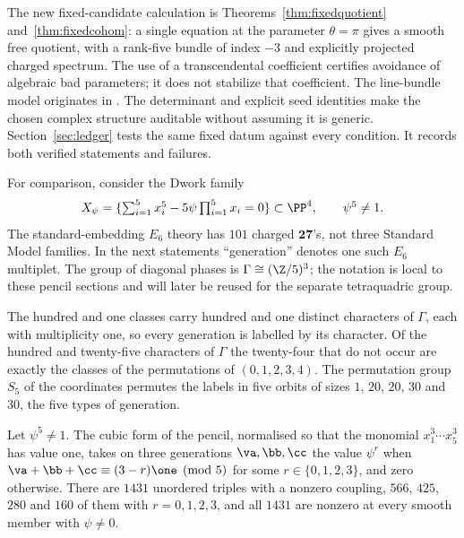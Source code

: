 The new fixed-candidate calculation is
Theorems~\ref{thm:fixedquotient} and~\ref{thm:fixedcohom}:
a single equation at the parameter $\theta=\pi$ gives a smooth free
quotient, with a rank-five bundle of index $-3$ and explicitly projected
charged spectrum. The use of a transcendental coefficient certifies
avoidance of algebraic bad parameters; it does not stabilize that
coefficient. The line-bundle model originates in \cite{BCL}.
The determinant and explicit seed identities make the chosen
complex structure auditable without assuming it is generic.
Section~\ref{sec:ledger} tests the same fixed datum against every
condition. It records both verified statements and failures.

For comparison, consider the Dwork family
\begin{equation}\label{eq:dwork}
 X_\psi=\{\textstyle\sum_{i=1}^5 x_i^5-5\psi\prod_{i=1}^5x_i=0\}
 \subset\PP^4,\qquad\psi^5\ne1.
\end{equation}
The standard-embedding $E_6$ theory has $101$ charged $\mathbf{27}$'s,
not three Standard Model families. In the next statements ``generation''
denotes one such $E_6$ multiplet. The group of diagonal phases is
$\Gamma\cong(\Z/5)^3$; the notation is local to these pencil sections
and will later be reused for the separate tetraquadric group.


\begin{theorem}[Labels]\label{thm:A}
The hundred and one classes carry hundred and one distinct characters of
$\Gamma$, each with multiplicity one, so every generation is labelled by
its character. Of the hundred and twenty-five characters of $\Gamma$ the
twenty-four that do not occur are exactly the classes of the permutations
of $(0,1,2,3,4)$. The permutation group $S_5$ of the coordinates permutes
the labels in five orbits of sizes $1$, $20$, $20$, $30$ and $30$, the five
types of generation.
\end{theorem}

\begin{theorem}[Couplings]\label{thm:B}
Let $\psi^5\ne1$. The cubic form of the pencil, normalised so that the
monomial $x_1^3\cdots x_5^3$ has value one, takes on three generations
$\va,\bb,\cc$ the value $\psi^{r}$ when $\va+\bb+\cc\equiv(3-r)\one\pmod 5$
for some $r\in\{0,1,2,3\}$, and zero otherwise. There are $1431$ unordered
triples with a nonzero coupling, $566$, $425$, $280$ and $160$ of them with
$r=0,1,2,3$, and all $1431$ are nonzero at every smooth member with
$\psi\ne0$.
\end{theorem}

